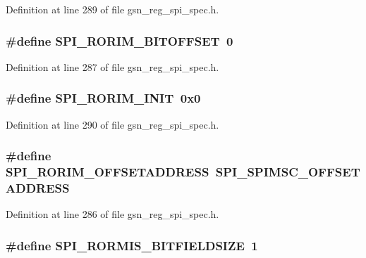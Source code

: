 Definition at line 289 of file gsn\_\-reg\_\-spi\_\-spec.h.

\hypertarget{a00573_a0f4f331185afea92b5efb19347c02fec}{
\subsubsection[{SPI\_\-RORIM\_\-BITOFFSET}]{\setlength{\rightskip}{0pt plus 5cm}\#define SPI\_\-RORIM\_\-BITOFFSET~0}}
\label{a00573_a0f4f331185afea92b5efb19347c02fec}


Definition at line 287 of file gsn\_\-reg\_\-spi\_\-spec.h.

\hypertarget{a00573_a0ffce744f6e410787ca6b112cc33a630}{
\subsubsection[{SPI\_\-RORIM\_\-INIT}]{\setlength{\rightskip}{0pt plus 5cm}\#define SPI\_\-RORIM\_\-INIT~0x0}}
\label{a00573_a0ffce744f6e410787ca6b112cc33a630}


Definition at line 290 of file gsn\_\-reg\_\-spi\_\-spec.h.

\hypertarget{a00573_a495f3db6f3a59bfa4e33a6a8778c19de}{
\subsubsection[{SPI\_\-RORIM\_\-OFFSETADDRESS}]{\setlength{\rightskip}{0pt plus 5cm}\#define SPI\_\-RORIM\_\-OFFSETADDRESS~SPI\_\-SPIMSC\_\-OFFSETADDRESS}}
\label{a00573_a495f3db6f3a59bfa4e33a6a8778c19de}


Definition at line 286 of file gsn\_\-reg\_\-spi\_\-spec.h.

\hypertarget{a00573_a32770f6db6a124288ea37856d841f1eb}{
\subsubsection[{SPI\_\-RORMIS\_\-BITFIELDSIZE}]{\setlength{\rightskip}{0pt plus 5cm}\#define SPI\_\-RORMIS\_\-BITFIELDSIZE~1}}
\label{a00573_a32770f6db6a124288ea37856d841f1eb}


